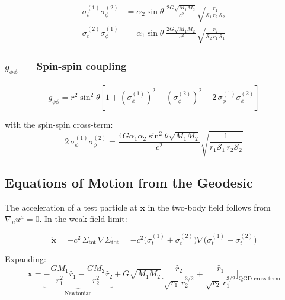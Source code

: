 \documentclass[11pt,a4paper]{article}
\theoremstyle{definition}
\theoremstyle{remark}
\newcommand{\sig}[2]{\sigma_{#1}^{(#2)}}
\newcommand{\boldx}{\mathbf{x}}
\newcommand{\Sigtot}{\Sigma_{\text{tot}}}
\begin{document}
	\begin{align}
		\sig{t}{1}\sig{\phi}{2}
		&= \alpha_2\sin\theta\;\frac{2G\sqrt{M_1 M_2}}{c^2}
		\sqrt{\frac{r_1}{\mathcal{S}_1\,r_2\,\mathcal{S}_2}}
		\label{eq:cross_spin_12}\\
		\sig{t}{2}\sig{\phi}{1}
		&= \alpha_1\sin\theta\;\frac{2G\sqrt{M_1 M_2}}{c^2}
		\sqrt{\frac{r_2}{\mathcal{S}_2\,r_1\,\mathcal{S}_1}}
		\label{eq:cross_spin_21}
	\end{align}
	
	\subsubsection{$g_{\phi\phi}$ — Spin-spin coupling}
	
	\begin{equation}\label{eq:gphiphi_expanded}
		g_{\phi\phi} = r^2\sin^2\!\theta\left[
		1
		+\left(\sig{\phi}{1}\right)^2
		+\left(\sig{\phi}{2}\right)^2
		+2\,\sig{\phi}{1}\sig{\phi}{2}
		\right]
	\end{equation}
	
	with the spin-spin cross-term:
	\begin{equation}
		2\,\sig{\phi}{1}\sig{\phi}{2}
		= \frac{4G\alpha_1\alpha_2\sin^2\!\theta\sqrt{M_1M_2}}{c^2}
		\sqrt{\frac{1}{r_1\mathcal{S}_1\,r_2\mathcal{S}_2}}
	\end{equation}
	
	\subsection{Equations of Motion from the Geodesic}
	
	The acceleration of a test particle at $\boldx$ in the two-body field
	follows from $\nabla_u u^\mu=0$. In the weak-field limit:
	
	\begin{equation}\label{eq:geodesic_accel}
		\ddot{\boldx} = -c^2\,\Sigtot\,\nabla\Sigtot
		= -c^2\bigl(\sig{t}{1}+\sig{t}{2}\bigr)
		\nabla\bigl(\sig{t}{1}+\sig{t}{2}\bigr)
	\end{equation}
	
	Expanding:
	\begin{equation}\label{eq:accel_expanded}
		\boxed{
			\ddot{\boldx}
			= \underbrace{-\frac{GM_1}{r_1^2}\hat{r}_1
				-\frac{GM_2}{r_2^2}\hat{r}_2}_{\text{Newtonian}}
			+ G\sqrt{M_1 M_2}
			\Biggl[
			\frac{\hat{r}_2}{\sqrt{r_1}\,r_2^{3/2}}
			+\frac{\hat{r}_1}{\sqrt{r_2}\,r_1^{3/2}}
			\Biggr]_{\text{QGD cross-term}}
		}
	\end{equation}
	
\end{document}
